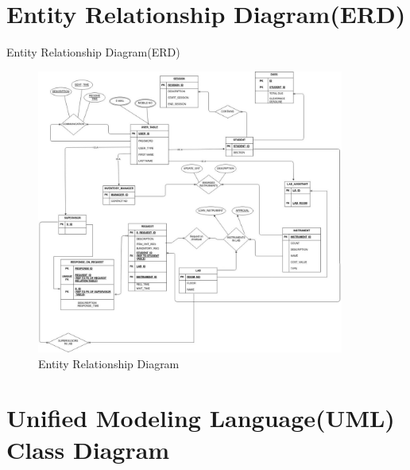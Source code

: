 \documentclass[20pt]{beamer}
\numberwithin{figure}{section}
\begin{document}
\section{Entity Relationship Diagram(ERD)}

\begin{frame}{Entity Relationship Diagram(ERD)}

     \begin{figure}
        \centering
        \includegraphics[width= 0.9\textwidth , height= 0.8\paperheight]{ERD.jpg}
        \caption{{Entity Relationship Diagram}}
        \label{fig:4}
    \end{figure}

\end{frame}

\section{Unified Modeling Language(UML) Class Diagram}
\end{document}
